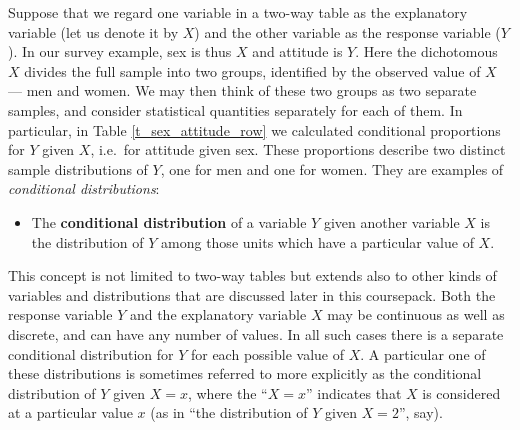 Suppose that we regard one variable in a two-way table as the
explanatory variable (let us denote it by $X$) and the other variable as
the response variable ($Y$). In our survey example, sex is thus $X$ and
attitude is $Y$. Here the dichotomous $X$ divides the full sample into
two groups, identified by the observed value of $X$ --- men and women.
We may then think of these two groups as two separate samples, and
consider statistical quantities separately for each of them. In
particular, in Table \ref{t_sex_attitude_row} we calculated conditional
proportions for $Y$ given $X$, i.e.\ for attitude given sex.
These proportions describe two distinct sample distributions of $Y$,
one for men and one for women. They are examples of \emph{conditional
distributions}:
\begin{itemize}
\item
The \textbf{conditional distribution} of a variable $Y$ given another
variable $X$ is the distribution of $Y$ among those units which have a
particular value of $X$.
\end{itemize}
This concept is not limited to two-way tables but extends also to other
kinds of variables and distributions that are discussed later in this
coursepack. Both the response variable $Y$ and the explanatory variable
$X$ may be continuous as well as discrete, and can have any number of
values. In all such cases there is a separate conditional distribution
for $Y$ for each possible value of $X$. A particular one of these
distributions is sometimes referred to more explicitly as the
conditional distribution of $Y$ given $X=x$, where the ``$X=x$''
indicates that $X$ is considered at a particular value $x$ (as in ``the
distribution of $Y$ given $X=2$'', say).


